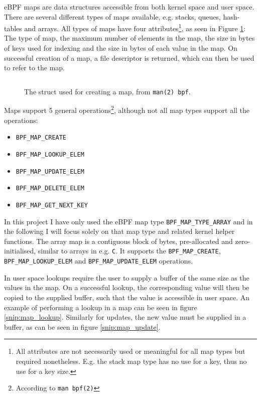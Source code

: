 eBPF maps are data structures accessible from both kernel space and user space.
There are several different types of maps available, e.g. stacks, queues, hash-tables and arrays.
All types of maps have four attributes\footnote{All attributes are not necessarily used or meaningful for all map types but required nonetheless. E.g. the stack map type has no use for a key, thus no use for a key size.}, as seen in Figure \ref{snip:map_struct}: The type of map, the maximum number of elements in the map, the size in bytes of keys used for indexing and the size in bytes of each value in the map. On successful creation of a map, a file descriptor is returned, which can then be used to refer to the map. 

\begin{figure}[htbp!]
  \centering
  \inputminted[linenos]{C}{snippets/map_struct.c}
  \caption{The struct used for creating a map, from \texttt{man(2) bpf}.}
  \label{snip:map_struct}
\end{figure}


Maps support 5 general operations\footnote{According to \texttt{man bpf(2)}}, although not all map types support all the operations:
\begin{itemize}
\item \verb!BPF_MAP_CREATE!
\item \verb!BPF_MAP_LOOKUP_ELEM!
\item \verb!BPF_MAP_UPDATE_ELEM!
\item \verb!BPF_MAP_DELETE_ELEM!
\item \verb!BPF_MAP_GET_NEXT_KEY!  
\end{itemize}

In this project I have only used the eBPF map type \verb!BPF_MAP_TYPE_ARRAY! and in the following I will focus solely on that map type and related kernel helper functions.
The array map is a contiguous block of bytes, pre-allocated and zero-initialised, similar to arrays in e.g. \verb!C!. It supports the \verb!BPF_MAP_CREATE!, \verb!BPF_MAP_LOOKUP_ELEM! and \verb!BPF_MAP_UPDATE_ELEM! operations.

In user space lookups require the user to supply a buffer of the same size as the values in the map. On a successful lookup, the corresponding value will then be copied to the supplied buffer, such that the value is accessible in user space. An example of performing a lookup in a map can be seen in figure \ref{snip:map_lookup}. Similarly for updates, the new value must be supplied in a buffer, as can be seen in figure \ref{snip:map_update}. 


